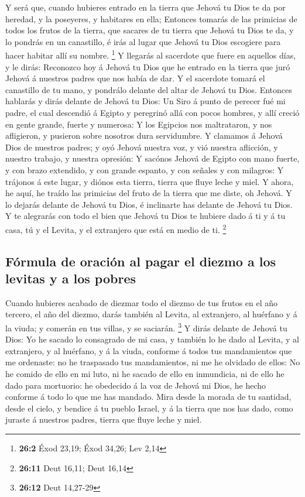  Y será que, cuando hubieres entrado en la tierra que Jehová
tu Dios te da por heredad, y la poseyeres, y habitares en ella;
 Entonces tomarás de las primicias de todos los frutos de la
tierra, que sacares de tu tierra que Jehová tu Dios te da, y lo pondrás
en un canastillo, é irás al lugar que Jehová tu Dios escogiere para
hacer habitar allí su nombre. \footnote{\textbf{26:2} Éxod 23,19; Éxod
  34,26; Lev 2,14}  Y llegarás al sacerdote que fuere en
aquellos días, y le dirás: Reconozco hoy á Jehová tu Dios que he entrado
en la tierra que juró Jehová á nuestros padres que nos había de dar.
 Y el sacerdote tomará el canastillo de tu mano, y pondrálo
delante del altar de Jehová tu Dios.  Entonces hablarás y
dirás delante de Jehová tu Dios: Un Siro á punto de perecer fué mi
padre, el cual descendió á Egipto y peregrinó allá con pocos hombres, y
allí creció en gente grande, fuerte y numerosa:  Y los
Egipcios nos maltrataron, y nos afligieron, y pusieron sobre nosotros
dura servidumbre.  Y clamamos á Jehová Dios de nuestros
padres; y oyó Jehová nuestra voz, y vió nuestra aflicción, y nuestro
trabajo, y nuestra opresión:  Y sacónos Jehová de Egipto con
mano fuerte, y con brazo extendido, y con grande espanto, y con señales
y con milagros:  Y trájonos á este lugar, y diónos esta
tierra, tierra que fluye leche y miel.  Y ahora, he aquí,
he traído las primicias del fruto de la tierra que me diste, oh Jehová.
Y lo dejarás delante de Jehová tu Dios, é inclinarte has delante de
Jehová tu Dios.  Y te alegrarás con todo el bien que Jehová
tu Dios te hubiere dado á ti y á tu casa, tú y el Levita, y el
extranjero que está en medio de ti. \footnote{\textbf{26:11} Deut 16,11;
  Deut 16,14}

\hypertarget{fuxf3rmula-de-oraciuxf3n-al-pagar-el-diezmo-a-los-levitas-y-a-los-pobres}{%
\subsection{Fórmula de oración al pagar el diezmo a los levitas y a los
pobres}\label{fuxf3rmula-de-oraciuxf3n-al-pagar-el-diezmo-a-los-levitas-y-a-los-pobres}}

 Cuando hubieres acabado de diezmar todo el diezmo de tus
frutos en el año tercero, el año del diezmo, darás también al Levita, al
extranjero, al huérfano y á la viuda; y comerán en tus villas, y se
saciarán. \footnote{\textbf{26:12} Deut 14,27-29}  Y dirás
delante de Jehová tu Dios: Yo he sacado lo consagrado de mi casa, y
también lo he dado al Levita, y al extranjero, y al huérfano, y á la
viuda, conforme á todos tus mandamientos que me ordenaste: no he
traspasado tus mandamientos, ni me he olvidado de ellos: 
No he comido de ello en mi luto, ni he sacado de ello en inmundicia, ni
de ello he dado para mortuorio: he obedecido á la voz de Jehová mi Dios,
he hecho conforme á todo lo que me has mandado.  Mira desde
la morada de tu santidad, desde el cielo, y bendice á tu pueblo Israel,
y á la tierra que nos has dado, como juraste á nuestros padres, tierra
que fluye leche y miel.

